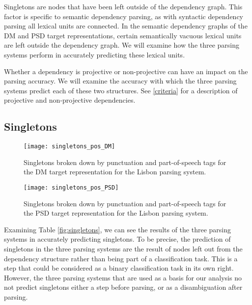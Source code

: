Singletons are nodes that have been left outside of the dependency graph. This factor is specific to semantic dependency parsing, as with syntactic dependency parsing all lexical units are connected. In the semantic dependency graphs of the DM and PSD target representations, certain semantically vacuous lexical units are left outside the dependency graph. We will examine how the three parsing systems perform in accurately predicting these lexical units.

Whether a dependency is projective or non-projective can have an impact on the parsing accuracy. We will examine the accuracy with which the three parsing systems predict each of these two structures. See \ref{criteria} for a description of projective and non-projective dependencies.

\subsection{Singletons}

\begin{figure}[h]
    \centering
    \begin{minipage}{0.8\textwidth}
        \centering
        \texttt{[image: singletons\_pos\_DM]}
    \end{minipage}\hfill
    \caption{Singletons broken down by punctuation and part-of-speech tags for the DM target representation for the Lisbon parsing system.}
    \label{fig:singletons_pos}
\end{figure}

\begin{figure}[h]
    \centering
    \begin{minipage}{0.8\textwidth}
        \centering
        \texttt{[image: singletons\_pos\_PSD]}
    \end{minipage}
    \caption{Singletons broken down by punctuation and part-of-speech tags for the PSD target representation for the Lisbon parsing system.}
    \label{fig:singletons_pos}
\end{figure}

Examining Table \ref{fig:singletons}, we can see the results of the three parsing systems in accurately predicting singletons. To be precise, the prediction of singletons in the three parsing systems are the result of nodes left out from the dependency structure rather than being part of a classification task. This is a step that could be considered as a binary classification task in its own right. However, the three parsing systems that are used as a basis for our analysis no not predict singletons either a step before parsing, or as a disambiguation after parsing.

